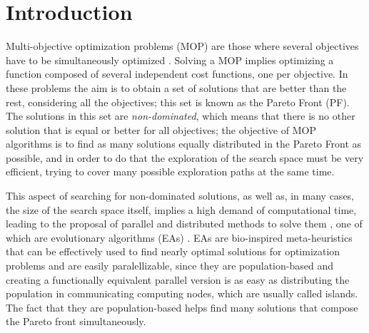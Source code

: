 \documentclass[preprint]{elsarticle}
\begin{document}
\section{Introduction}


Multi-objective optimization problems (MOP) are those where several
objectives have to be simultaneously optimized
\citep{Mora13paretobased,LIU2017344}. Solving a MOP implies optimizing a function composed of several independent cost functions, one per objective. In
these problems the aim is to obtain a set of solutions that are better
than the rest, considering all the objectives; this set is known as
the Pareto Front (PF). The solutions in this set are {\em non-dominated},
which means that there is no other solution that is equal or better
for all objectives; the objective of MOP algorithms is to find as many
solutions equally distributed in the Pareto Front as possible, and in order to do that the
exploration of the search space must be very efficient, trying to
cover many possible exploration paths at the same time. 

This aspect of searching for non-dominated solutions, as well as, in
many cases, the size of the search space itself, implies a high demand
of computational time, leading to the proposal of parallel and distributed methods to solve them
\citep{Luna15Survey,Mukhopadhyay14Survey,Chavez15MO,Hidalgo16residualstress,KAUR2018183,XU2018268},
one of which are evolutionary algorithms (EAs)
\citep{DBLP:series/ncs/EibenS15}. EAs are bio-inspired meta-heuristics
that can be effectively used to find nearly optimal solutions for
optimization problems and are easily paralellizable, since they are
population-based and creating a functionally equivalent parallel
version is as easy as distributing the population in communicating
computing nodes, which are usually called islands. The fact that
they are population-based helps find many solutions that compose the
Pareto front simultaneously.
\end{document}
